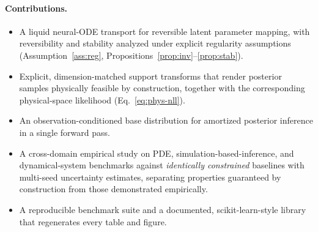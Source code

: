 \paragraph{Contributions.}
\begin{itemize}
\item A liquid neural-ODE transport for reversible latent parameter mapping, with
reversibility and stability analyzed under explicit regularity assumptions
(Assumption~\ref{ass:reg}, Propositions~\ref{prop:inv}--\ref{prop:stab}).
\item Explicit, dimension-matched support transforms that render posterior
samples physically feasible by construction, together with the corresponding
physical-space likelihood (Eq.~\ref{eq:phys-nll}).
\item An observation-conditioned base distribution for amortized posterior
inference in a single forward pass.
\item A cross-domain empirical study on PDE, simulation-based-inference, and
dynamical-system benchmarks against \emph{identically constrained} baselines with
multi-seed uncertainty estimates, separating properties guaranteed by
construction from those demonstrated empirically.
\item A reproducible benchmark suite and a documented, scikit-learn-style library
that regenerates every table and figure.
\end{itemize}
